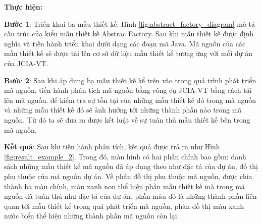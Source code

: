\documentclass[12pt]{report}
\begin{document}
\noindent \textbf{Thực hiện:}

\noindent \textbf{Bước 1}: Triển khai ba mẫu thiết kế. Hình \ref{fig:abstract_factory_diagram} mô tả cấu trúc của kiểu mẫu thiết kế Abstrac Factory. Sau khi mẫu thiết kế được định nghĩa và tiến hành triển khai dưới dạng các đoạn mã Java. Mã nguồn của các mẫu thiết kế sẽ được tải lên cơ sở dữ liệu mẫu thiết kế tương ứng với mỗi dự án của JCIA-VT.

\noindent \textbf{Bước 2}: Sau khi áp dụng ba mẫu thiết kế kể trên vào trong quá trình phát triển mã nguồn, tiến hành phân tích mã nguồn bằng công cụ JCIA-VT bằng cách tải lên mã nguồn.  để kiểm tra sự tồn tại của những mẫu thiết kế đó trong mã nguồn và những mẫu thiết kế đó sẽ ảnh hưởng tới những thành phần nào trong mã nguồn. Từ đó ta sẽ đưa ra được kết luật về sự tuân thủ mẫu thiết kế bên trong mã nguồn.

\noindent \textbf{Kết quả}: Sau khi tiến hành phân tích, kết quả được trả ra như Hình \ref{fig:result_example_2}. Trong đó, màn hình có hai phần chính bao gồm: danh sách những mẫu thiết kế mã nguồn đã áp dụng theo như đặc tả của dự án, đồ thị phụ thuộc của mã nguồn dự án. Về phần đồ thị phụ thuộc mã nguồn, được chia thành ba màu chính, màu xanh non thể hiện phần mẫu thiết kế mà trong mã nguồn đã tuân thủ như đặc tả của dự án, phần màu đỏ là những thành phần liên quan tới mẫu thiết kế trong quá phát triển mã nguồn, phàn đồ thị màu xanh nước biển thể hiện những thành phần mã nguồn còn lại.
\end{document}
